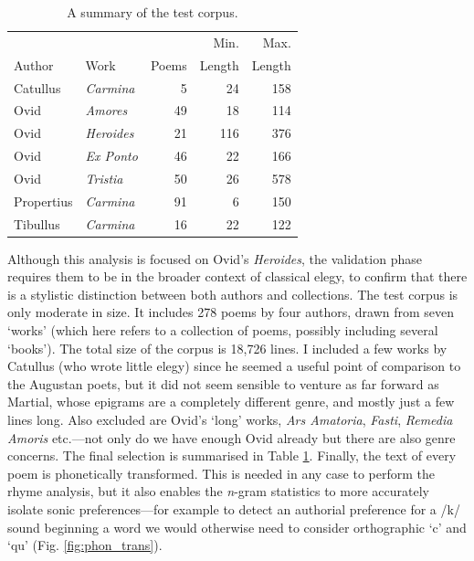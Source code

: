 \documentclass[twocolumn, switch, a4paper]{article} %
\begin{document}
\begin{table}
\caption{A summary of the test corpus.}
\label{tab:corpus}
\centering
\begin{tabular}{llrrr}
            &                  &       &   Min.  &  Max. \\
     Author &   Work           & Poems & Length  & Length \\
\midrule
   Catullus &  \emph{Carmina}  &     5 &   24 &  158 \\
       Ovid &  \emph{Amores}   &    49 &   18 &  114 \\
       Ovid &  \emph{Heroides} &    21 &  116 &  376 \\
       Ovid &  \emph{Ex Ponto} &    46 &   22 &  166 \\
       Ovid &  \emph{Tristia}  &    50 &   26 &  578 \\
 Propertius &  \emph{Carmina}  &    91 &    6 &  150 \\
   Tibullus &  \emph{Carmina}  &    16 &   22 &  122 \\
\bottomrule
\end{tabular}
\end{table}

Although this analysis is focused on Ovid's \emph{Heroides}, the validation
phase requires them to be in the broader context of classical elegy, to
confirm that there is a stylistic distinction between both authors and
collections. The test corpus is only moderate in size. It includes 278 poems
by four authors, drawn from seven `works' (which here refers to a collection of
poems, possibly including several `books'). The total size of the corpus is
18,726 lines. I included a few works by Catullus (who wrote little elegy)
since he seemed a useful point of comparison to the Augustan poets, but it did
not seem sensible to venture as far forward as Martial, whose epigrams are a
completely different genre, and mostly just a few lines long. Also excluded
are Ovid's `long' works, \emph{Ars Amatoria}, \emph{Fasti}, \emph{Remedia
Amoris} etc.---not only do we have enough Ovid already but there are also
genre concerns. The final selection is summarised in Table \ref{tab:corpus}.
Finally, the text of every poem is phonetically transformed. This is needed in
any case to perform the rhyme analysis, but it also enables the \emph{n}-gram
statistics to more accurately isolate sonic preferences---for example to
detect an authorial preference for a /k/ sound beginning a word we would
otherwise need to consider orthographic `c' and `qu' (Fig.
\ref{fig:phon_trans}).
\end{document}
